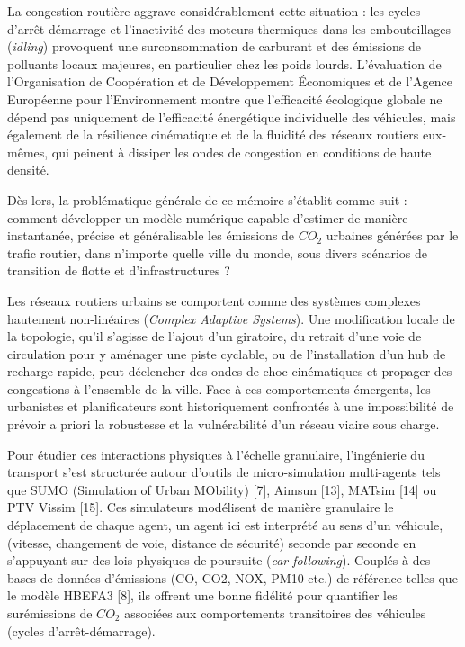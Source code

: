 \documentclass[10pt, a4paper]{article}
\begin{document}
La congestion routière aggrave considérablement cette situation : les
cycles d'arrêt-démarrage et l'inactivité des moteurs thermiques dans les
embouteillages (\emph{idling}) provoquent une surconsommation de
carburant et des émissions de polluants locaux majeures, en particulier
chez les poids lourds. L'évaluation de l'Organisation de Coopération et
de Développement Économiques et de l'Agence Européenne pour
l'Environnement montre que l'efficacité écologique globale ne dépend pas
uniquement de l'efficacité énergétique individuelle des véhicules, mais
également de la résilience cinématique et de la fluidité des réseaux
routiers eux-mêmes, qui peinent à dissiper les ondes de congestion en
conditions de haute densité.

Dès lors, la problématique générale de ce mémoire s'établit comme suit :
comment développer un modèle numérique capable d'estimer de manière
instantanée, précise et généralisable les émissions de \(CO_2\) urbaines
générées par le trafic routier, dans n'importe quelle ville du monde,
sous divers scénarios de transition de flotte et d'infrastructures ?

Les réseaux routiers urbains se comportent comme des systèmes complexes
hautement non-linéaires (\emph{Complex Adaptive Systems}). Une
modification locale de la topologie, qu'il s'agisse de l'ajout d'un
giratoire, du retrait d'une voie de circulation pour y aménager une
piste cyclable, ou de l'installation d'un hub de recharge rapide, peut
déclencher des ondes de choc cinématiques et propager des congestions à
l'ensemble de la ville. Face à ces comportements émergents, les
urbanistes et planificateurs sont historiquement confrontés à une
impossibilité de prévoir a priori la robustesse et la vulnérabilité d'un
réseau viaire sous charge.

Pour étudier ces interactions physiques à l'échelle granulaire,
l'ingénierie du transport s'est structurée autour d'outils de
micro-simulation multi-agents tels que SUMO (Simulation of Urban
MObility) {[}7{]}, Aimsun {[}13{]}, MATsim {[}14{]} ou PTV Vissim
{[}15{]}. Ces simulateurs modélisent de manière granulaire le
déplacement de chaque agent, un agent ici est interprété au sens d'un
véhicule, (vitesse, changement de voie, distance de sécurité) seconde
par seconde en s'appuyant sur des lois physiques de poursuite
(\emph{car-following}). Couplés à des bases de données d'émissions (CO,
CO2, NOX, PM10 etc.) de référence telles que le modèle HBEFA3 {[}8{]},
ils offrent une bonne fidélité pour quantifier les surémissions de
\(CO_2\) associées aux comportements transitoires des véhicules (cycles
d'arrêt-démarrage).
\end{document}
